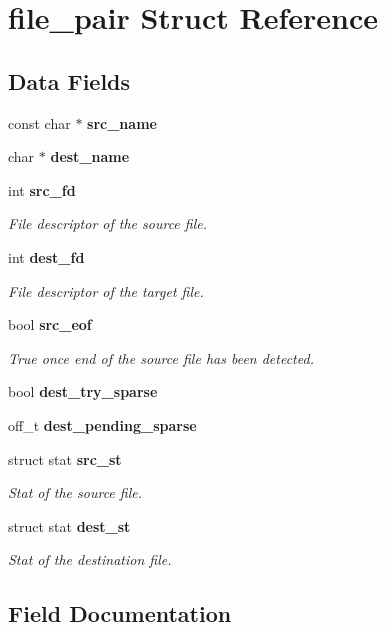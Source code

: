 \section{file\-\_\-pair Struct Reference}
\label{structfile__pair}
\subsection*{Data Fields}
\begin{DoxyCompactItemize}
\item 
const char $\ast$ {\bf src\-\_\-name}
\item 
char $\ast$ {\bf dest\-\_\-name}
\item 
int {\bf src\-\_\-fd}
\begin{DoxyCompactList}\small\item\em File descriptor of the source file. \end{DoxyCompactList}\item 
int {\bf dest\-\_\-fd}
\begin{DoxyCompactList}\small\item\em File descriptor of the target file. \end{DoxyCompactList}\item 
bool {\bf src\-\_\-eof}
\begin{DoxyCompactList}\small\item\em True once end of the source file has been detected. \end{DoxyCompactList}\item 
bool {\bf dest\-\_\-try\-\_\-sparse}
\item 
off\-\_\-t {\bf dest\-\_\-pending\-\_\-sparse}
\item 
struct stat {\bf src\-\_\-st}
\begin{DoxyCompactList}\small\item\em Stat of the source file. \end{DoxyCompactList}\item 
struct stat {\bf dest\-\_\-st}
\begin{DoxyCompactList}\small\item\em Stat of the destination file. \end{DoxyCompactList}\end{DoxyCompactItemize}


\subsection{Field Documentation}
